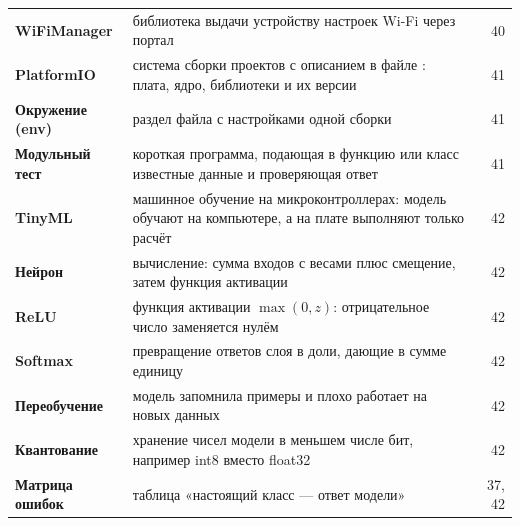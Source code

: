 {\begin{xltabular}{\textwidth}{@{}>{\bfseries}p{40mm} X r@{}}
WiFiManager & библиотека выдачи устройству настроек Wi-Fi через портал & 40 \\
PlatformIO & система сборки проектов с описанием в файле : плата, ядро, библиотеки и их версии & 41 \\
Окружение (env) & раздел  файла  с настройками одной сборки & 41 \\
Модульный тест & короткая программа, подающая в функцию или класс известные данные и проверяющая ответ & 41 \\
TinyML & машинное обучение на микроконтроллерах: модель обучают на компьютере, а на плате выполняют только расчёт & 42 \\
Нейрон & вычисление: сумма входов с весами плюс смещение, затем функция активации & 42 \\
ReLU & функция активации $\max(0,z)$: отрицательное число заменяется нулём & 42 \\
Softmax & превращение ответов слоя в доли, дающие в сумме единицу & 42 \\
Переобучение & модель запомнила примеры и плохо работает на новых данных & 42 \\
Квантование & хранение чисел модели в меньшем числе бит, например int8 вместо float32 & 42 \\
Матрица ошибок & таблица «настоящий класс --- ответ модели» & 37, 42 \\
\bottomrule
\end{xltabular}
}
